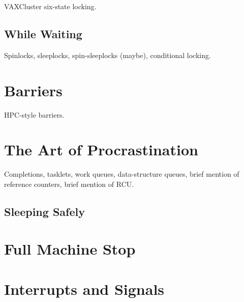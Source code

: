 VAXCluster six-state locking.

\subsection{While Waiting}
\label{sec:sync:While Waiting}

Spinlocks, sleeplocks, spin-sleeplocks (maybe), conditional locking.

\section{Barriers}
\label{sec:sync:Barriers}

HPC-style barriers.

\section{The Art of Procrastination}
\label{sec:sync:The Art of Procrastination}

Completions, tasklets, work queues, data-structure queues,
brief mention of reference counters,
brief mention of RCU.

\subsection{Sleeping Safely}
\label{sec:sync:Sleeping Safely}

\section{Full Machine Stop}
\label{sec:sync:Full Machine Stop}

\section{Interrupts and Signals}
\label{sec:sync:Interrupts and Signals}
